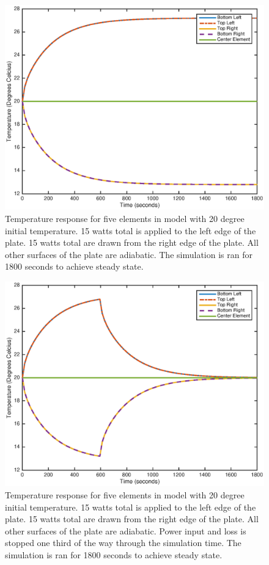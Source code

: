 \documentclass[10pt,twocolumn]{article}
\begin{document}
\begin{figure}
	\center
	\includegraphics[width=0.8\linewidth]{TmpRspn25x25,15Wleftedge,-15Wrightedge.eps}
	\caption{Temperature response for five elements in model with 20 degree initial temperature. 15 watts total is applied to the left edge of the plate. 15 watts total are drawn from the right edge of the plate. All other surfaces of the plate are adiabatic. The simulation is ran for 1800 seconds to achieve steady state.}
	\label{fig:TmpRspn25x25,15Wleftedge,-15Wrightedge}
\end{figure}

\begin{figure}
	\center
	\includegraphics[width=0.8\linewidth]{TmpRspn25x25,15Wleftedge,-15Wrightedge,halftime.eps}
	\caption{Temperature response for five elements in model with 20 degree initial temperature. 15 watts total is applied to the left edge of the plate. 15 watts total are drawn from the right edge of the plate. All other surfaces of the plate are adiabatic. Power input and loss is stopped one third of the way through the simulation time. The simulation is ran for 1800 seconds to achieve steady state.}
	\label{fig:TmpRspn25x25,15Wleftedge,-15Wrightedge,halftime}
\end{figure}
\end{document}

